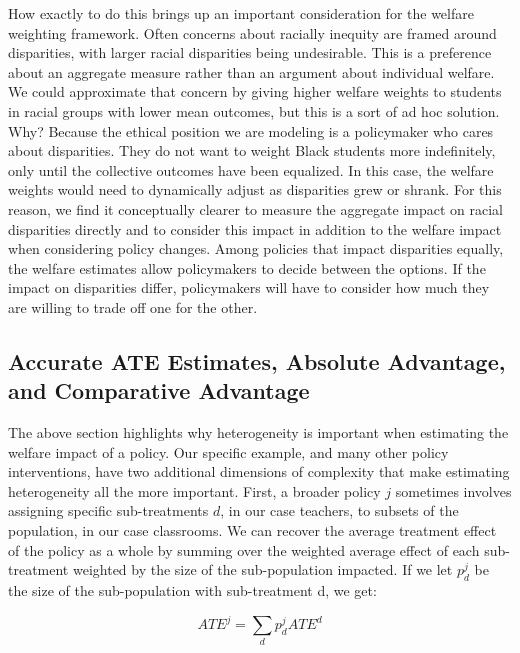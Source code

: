 \documentclass[12pt]{article}
\theoremstyle{definition}
\theoremstyle{definition}
\theoremstyle{definition}
\theoremstyle{definition}
\begin{document}
    How exactly to do this brings up an important consideration for the welfare weighting framework. Often concerns about racially inequity are framed around disparities, with larger racial disparities being undesirable. This is a preference about an aggregate measure rather than an argument about individual welfare. We could approximate that concern by giving higher welfare weights to students in racial groups with lower mean outcomes, but this is a sort of ad hoc solution. Why? Because the ethical position we are modeling is a policymaker who cares about disparities. They do not want to weight Black students more indefinitely, only until the collective outcomes have been equalized. In this case, the welfare weights would need to dynamically adjust as disparities grew or shrank. For this reason, we find it conceptually clearer to measure the aggregate impact on racial disparities directly and to consider this impact in addition to the welfare impact when considering policy changes. Among policies that impact disparities equally, the welfare estimates allow policymakers to decide between the options. If the impact on disparities differ, policymakers will have to consider how much they are willing to trade off one for the other.      


    
   \subsection{Accurate ATE Estimates, Absolute Advantage, and Comparative Advantage }

    The above section highlights why heterogeneity is important when estimating the welfare impact of a policy. Our specific example, and many other policy interventions, have two additional dimensions of complexity that make estimating heterogeneity all the more important. First, a broader policy $j$ sometimes involves assigning specific sub-treatments $d$, in our case teachers, to subsets of the population, in our case classrooms. We can recover the average treatment effect of the policy as a whole by summing over the weighted average effect of each sub-treatment weighted by the size of the sub-population impacted. If we let $ p^j_d$ be the size of the sub-population with sub-treatment d, we get:

    \begin{equation}
       ATE^j = \sum_d p^j_d ATE^d
    \end{equation}  
\end{document}
